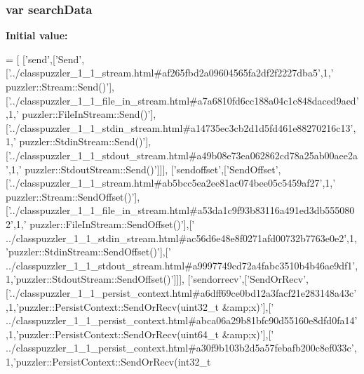 \subsubsection[{search\+Data}]{\setlength{\rightskip}{0pt plus 5cm}var search\+Data}\label{a00094_ad01a7523f103d6242ef9b0451861231e}
{\bfseries Initial value\+:}
\begin{DoxyCode}
=
[
  [\textcolor{stringliteral}{'send'},[\textcolor{stringliteral}{'Send'},[\textcolor{stringliteral}{'../classpuzzler\_1\_1\_stream.html#af265fbd2a09604565fa2df2f2227dba5'},1,\textcolor{stringliteral}{'
      puzzler::Stream::Send()'}],[\textcolor{stringliteral}{'../classpuzzler\_1\_1\_file\_in\_stream.html#a7a6810fd6cc188a04c1c848daced9aed'},1,\textcolor{stringliteral}{'
      puzzler::FileInStream::Send()'}],[\textcolor{stringliteral}{'../classpuzzler\_1\_1\_stdin\_stream.html#a14735ec3cb2d1d5fd461e88270216c13'},1,\textcolor{stringliteral}{'
      puzzler::StdinStream::Send()'}],[\textcolor{stringliteral}{'../classpuzzler\_1\_1\_stdout\_stream.html#a49b08e73ea062862cd78a25ab00aee2a'},1,\textcolor{stringliteral}{'
      puzzler::StdoutStream::Send()'}]]],
  [\textcolor{stringliteral}{'sendoffset'},[\textcolor{stringliteral}{'SendOffset'},[\textcolor{stringliteral}{'../classpuzzler\_1\_1\_stream.html#ab5bcc5ea2ee81ac074bee05c5459af27'},1,\textcolor{stringliteral}{'
      puzzler::Stream::SendOffset()'}],[\textcolor{stringliteral}{'../classpuzzler\_1\_1\_file\_in\_stream.html#a53da1c9f93b83116a491ed3db5550802'},1,\textcolor{stringliteral}{'
      puzzler::FileInStream::SendOffset()'}],[\textcolor{stringliteral}{'
      ../classpuzzler\_1\_1\_stdin\_stream.html#ac56d6e48e8f0271afd00732b7763e0e2'},1,\textcolor{stringliteral}{'puzzler::StdinStream::SendOffset()'}],[\textcolor{stringliteral}{'
      ../classpuzzler\_1\_1\_stdout\_stream.html#a9997749cd72a4fabc3510b4b46ae9df1'},1,\textcolor{stringliteral}{'puzzler::StdoutStream::SendOffset()'}]]],
  [\textcolor{stringliteral}{'sendorrecv'},[\textcolor{stringliteral}{'SendOrRecv'},[\textcolor{stringliteral}{'../classpuzzler\_1\_1\_persist\_context.html#a6dff69ce0bd12a3facf21e283148a43c'}
      ,1,\textcolor{stringliteral}{'puzzler::PersistContext::SendOrRecv(uint32\_t &amp;x)'}],[\textcolor{stringliteral}{'
      ../classpuzzler\_1\_1\_persist\_context.html#abca06a29b81bfc90d55160e8dfd0fa14'},1,\textcolor{stringliteral}{'puzzler::PersistContext::SendOrRecv(uint64\_t &amp;x)'}],[\textcolor{stringliteral}{'
      ../classpuzzler\_1\_1\_persist\_context.html#a30f9b103b2d5a57febafb200c8ef033c'},1,\textcolor{stringliteral}{'puzzler::PersistContext::SendOrRecv(int32\_t
}
\end{DoxyCode}
